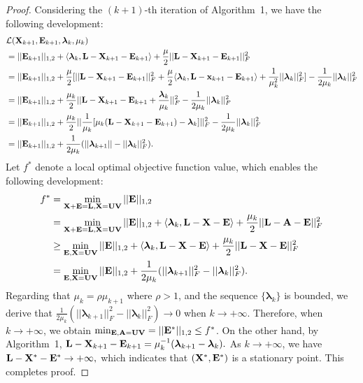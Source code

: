 \documentclass[letterpaper]{article}
\def\bA{{\bf A}}
\def\bE{{\bf E}}
\def\blambda{{\bm \lambda}}
\def\calL{{\mathcal{L}}}
\def\bL{{\bf L}}
\def\bU{{\bf U}}
\def\bV{{\bf V}}
\def\bX{{\bf X}}
\def\bx{{\bf x}}
\def\bA{{\bf A}}
\def\bx{{\bf x}}
\def\bX{{\bf X}}
\begin{document}
\begin{proof}
    Considering the $(k+1)$-th iteration of Algorithm~1, we have the following development:
    \begin{align}\label{eq:proof1}
      & \calL(\bX_{k+1}, \bE_{k+1}, \blambda_{k}, \mu_{k})   \nonumber \\
      & = || \bE_{k+1} ||_{1,2} + \langle \blambda_{k}, \bL - \bX_{k+1} - \bE_{k+1} \rangle + \frac{\mu}{2} || \bL - \bX_{k+1} - \bE_{k+1} ||_{F}^2         \nonumber \\
      & = || \bE_{k+1} ||_{1,2} + \frac{\mu}{2} [ || \bL - \bX_{k+1} - \bE_{k+1} ||_{F}^2 + \frac{\mu}{2} \langle \blambda_{k}, \bL - \bx_{k+1} - \bE_{k+1} \rangle + \frac{1}{\mu_{k}^2} || \blambda_k ||_F^2 ] - \frac{1}{2\mu_k} || \blambda_k ||_F^2    \nonumber  \\
      & = || \bE_{k+1} ||_{1,2} + \frac{\mu_k}{2} || \bL - \bX_{k+1} - \bE_{k+1} + \frac{\blambda_k}{\mu_k} ||_F^2 - \frac{1}{2\mu_k} || \blambda_k ||_F^2   \nonumber \\
      & = || \bE_{k+1} ||_{1,2} + \frac{\mu_k}{2} || \frac{1}{\mu_k} [ \mu_k (\bL - \bX_{k+1} - \bE_{k+1}) - \blambda_k ] ||_F^2 - \frac{1}{2\mu_k} || \blambda_k ||_F^2   \nonumber \\
      & = || \bE_{k+1} ||_{1,2} + \frac{1}{2\mu_k} ( || \blambda_{k+1} || - || \blambda_{k} ||_F^2 )   .
    \end{align}
    \noindent
    Let $f^*$ denote a local optimal objective function value, which enables the following development:
    \begin{align}\label{eq:proof2}
      f^* & = \min_{\bX + \bE = \bL, \bX = \bU \bV} || \bE ||_{1,2}   \nonumber  \\
          & = \min_{\bX + \bE = \bL, \bX = \bU \bV} || \bE ||_{1,2} + \langle \blambda_k, \bL - \bX - \bE \rangle + \frac{\mu_k}{2} || \bL - \bA - \bE ||_F^2   \nonumber \\
          & \geq \min_{\bE, \bX = \bU \bV} || \bE ||_{1,2} + \langle \blambda_k, \bL - \bX - \bE \rangle + \frac{\mu_k}{2} ||  \bL -
          \bX - \bE ||_F^2     \nonumber \\
          & = \min_{\bE, \bX = \bU \bV} || \bE ||_{1,2} + \frac{1}{2\mu_k} (|| \blambda_{k+1} ||_F^2 - || \blambda_{k} ||_F^2)   .
    \end{align}
    \indent
    Regarding that $\mu_{k} = \rho \mu_{k+1}$ where $\rho > 1$, and the sequence $\{ \blambda_k \}$ is bounded, we derive that
    $\frac{1}{2\mu_k} (|| \blambda_{k+1} ||_F^2 - || \blambda_{k} ||_F^2) \rightarrow 0$ when $k \rightarrow +\infty .$
    Therefore, when $k \rightarrow +\infty$, we obtain $\min_{\bE, \bA = \bU \bV} = || \bE^* ||_{1,2} \leq f^*$.
    On the other hand, by Algorithm~1, $\bL - \bX_{k+1} - \bE_{k+1} = \mu_k^{-1} (\blambda_{k+1} - \blambda_{k}) .$
    As $k \rightarrow +\infty$, we have $\bL - \bX^* - \bE^* \rightarrow +\infty  ,$
    which indicates that $(\bX^*, \bE^*)$ is a stationary point.
    This completes proof.
\end{proof}
\end{document}

